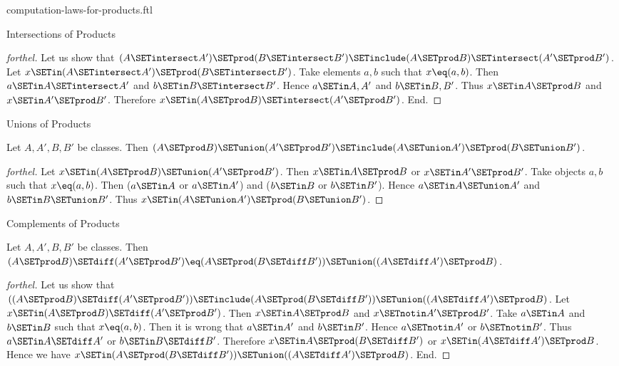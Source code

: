 \documentclass{stex}
\begin{document}
\begin{smodule}{computation-laws-for-products.ftl}
\begin{sfragment}{Intersections of Products}
\begin{proof}[forthel]
    Let us show that $(A \SETintersect A') \SETprod (B \SETintersect B') \SETinclude (A \SETprod B) \SETintersect (A' \SETprod B')$.
      Let $x \SETin (A \SETintersect A') \SETprod (B \SETintersect B')$.
      Take elements $a, b$ such that $x \eq (a, b)$.
      Then $a \SETin A \SETintersect A'$ and $b \SETin B \SETintersect B'$.
      Hence $a \SETin A, A'$ and $b \SETin B, B'$.
      Thus $x \SETin A \SETprod B$ and $x \SETin A' \SETprod B'$.
      Therefore $x \SETin (A \SETprod B) \SETintersect (A' \SETprod B')$.
    End.
  \end{proof}
\end{sfragment}

\begin{sfragment}{Unions of Products}
  \begin{proposition}[forthel,id=FOUNDATIONS_05_7090174334861312]
    Let $A, A', B, B'$ be classes.
    Then $(A \SETprod B) \SETunion (A' \SETprod B') \SETinclude (A \SETunion A') \SETprod (B \SETunion B')$.
  \end{proposition}
  \begin{proof}[forthel]
    Let $x \SETin (A \SETprod B) \SETunion (A' \SETprod B')$.
    Then $x \SETin A \SETprod B$ or $x \SETin A' \SETprod B'$.
    Take objects $a, b$ such that $x \eq (a, b)$.
    Then ($a \SETin A$ or $a \SETin A'$) and ($b \SETin B$ or $b \SETin B'$).
    Hence $a \SETin A \SETunion A'$ and $b \SETin B \SETunion B'$.
    Thus $x \SETin (A \SETunion A') \SETprod (B \SETunion B')$.
  \end{proof}
\end{sfragment}

\begin{sfragment}{Complements of Products}
  \begin{proposition}[forthel,id=FOUNDATIONS_05_5552125989879808]
    Let $A, A', B, B'$ be classes.
    Then $(A \SETprod B) \SETdiff (A' \SETprod B') \eq (A \SETprod (B \SETdiff B')) \SETunion ((A \SETdiff A') \SETprod B)$.
  \end{proposition}
  \begin{proof}[forthel]
    Let us show that $((A \SETprod B) \SETdiff (A' \SETprod B')) \SETinclude (A \SETprod (B \SETdiff B')) \SETunion ((A \SETdiff A') \SETprod B)$.
      Let $x \SETin (A \SETprod B) \SETdiff (A' \SETprod B')$.
      Then $x \SETin A \SETprod B$ and $x \SETnotin A' \SETprod B'$.
      Take $a \SETin A$ and $b \SETin B$ such that $x \eq (a, b)$.
      Then it is wrong that $a \SETin A'$ and $b \SETin B'$.
      Hence $a \SETnotin A'$ or $b \SETnotin B'$.
      Thus $a \SETin A \SETdiff A'$ or $b \SETin B \SETdiff B'$.
      Therefore $x \SETin A \SETprod (B \SETdiff B')$ or $x \SETin (A \SETdiff A') \SETprod B$.
      Hence we have $x \SETin (A \SETprod (B \SETdiff B')) \SETunion ((A \SETdiff A') \SETprod B)$.
    End.


\end{proof}
\end{sfragment}
\end{smodule}
\end{document}
